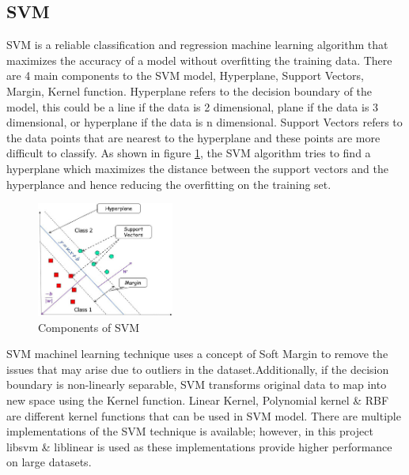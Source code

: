 \documentclass[twoside,11pt,a4paper]{article}
\begin{document}
\subsection{\acf{SVM}}
\acs{SVM} is a reliable classification and regression machine learning algorithm that maximizes the accuracy of a model without overfitting the training data. There are 4 main components to the \acs{SVM} model, Hyperplane, Support Vectors, Margin, Kernel function. Hyperplane refers to the decision boundary of the model, this could be a line if the data is 2 dimensional, plane if the data is 3 dimensional, or hyperplane if the data is n dimensional. Support Vectors refers to the data points that are nearest to the hyperplane and  these points are more difficult to classify. As shown in figure \ref{fig:svm}, the \acs{SVM} algorithm tries to find a hyperplane which maximizes the distance between the support vectors and the hyperplance and hence reducing the overfitting on the training set.
\begin{figure}[ht]
	\centering
	\includegraphics[width=0.4\textwidth]{svm}
	\caption[Support Vector Machine]{Components of \acs{SVM} \citep{rani2022machine}}
	\label{fig:svm}
\end{figure}
\acs{SVM} machinel learning technique uses a concept of Soft Margin to remove the issues that may arise due to outliers in the dataset.Additionally, if the decision boundary is non-linearly separable, \acs{SVM} transforms original data to map into new space using the Kernel function. Linear Kernel, Polynomial kernel \& \acf{RBF} are different kernel functions that can be used in \acs{SVM} model. There are multiple implementations of the \acs{SVM} technique is available; however, in this project libsvm\citep{chang2011libsvm} \& liblinear \citep{fan2008liblinear} is used as these implementations provide higher performance on large datasets.
\end{document}
